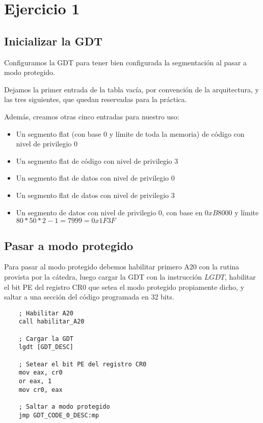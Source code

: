 \section{Ejercicio 1}

\subsection{Inicializar la GDT}

Configuramos la GDT para tener bien configurada la segmentación al pasar a modo protegido.

Dejamos la primer entrada de la tabla vacía, por convención de la arquitectura, y las tres siguientes, que quedan reservadas para la práctica.

Además, creamos otras cinco entradas para nuestro uso:

\begin{itemize}
    \item Un segmento flat (con base 0 y límite de toda la memoria) de código con nivel de privilegio 0
    \item Un segmento flat de código con nivel de privilegio 3
    \item Un segmento flat de datos con nivel de privilegio 0
    \item Un segmento flat de datos con nivel de privilegio 3
    \item Un segmento de datos con nivel de privilegio 0, con base en $0xB8000$ y límite $80 * 50 * 2 - 1 = 7999 = 0x1F3F$
\end{itemize}

\subsection{Pasar a modo protegido}

Para pasar al modo protegido debemos habilitar primero A20 con la rutina provista por la cátedra, luego cargar la GDT con la instrucción $LGDT$, habilitar el bit PE del registro CR0 que setea el modo protegido propiamente dicho, y saltar a una sección del código programada en 32 bits.

\begin{lstlisting}
    ; Habilitar A20
    call habilitar_A20

    ; Cargar la GDT
    lgdt [GDT_DESC]

    ; Setear el bit PE del registro CR0
    mov eax, cr0
    or eax, 1
    mov cr0, eax

    ; Saltar a modo protegido
    jmp GDT_CODE_0_DESC:mp
\end{lstlisting}

